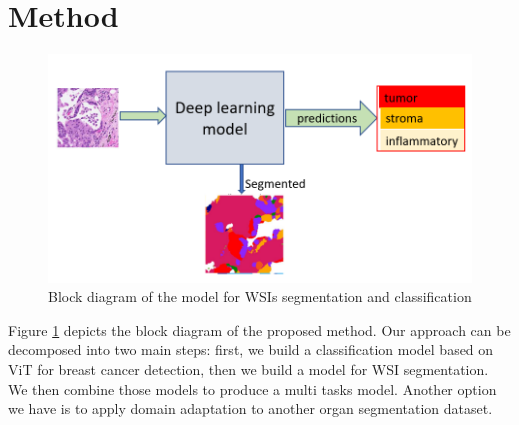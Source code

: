 \documentclass[review]{cvpr}
\begin{document}
\section{Method}
\begin{figure}[ht]
\begin{center}
   \includegraphics[width=0.8\linewidth]{media/roi1.PNG}
\end{center}
   \caption{Block diagram of the model for WSIs segmentation and classification}
\label{fig:roi}
\end{figure}
Figure \ref{fig:roi} depicts the block diagram of the proposed method. Our approach can be decomposed into two main steps: first, we build a classification model based on ViT for breast cancer detection, then we build a model for WSI segmentation. We then combine those models to produce a multi tasks model. Another option we have is to apply domain adaptation to another organ segmentation dataset. 
\end{document}
